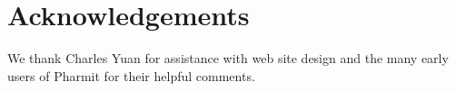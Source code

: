 \section{Acknowledgements}

We thank Charles Yuan for assistance with web site design and the many early users of Pharmit for their helpful comments.
